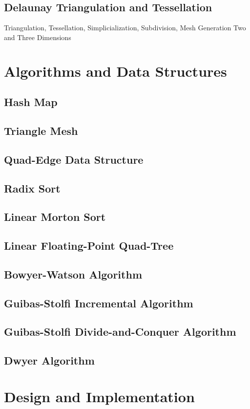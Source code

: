 \documentclass[10pt, twoside, fleqn]{article}
\let\oldsection\section
\renewcommand*\section{%
  \cleardoublepage
  \thispagestyle{sectionstyle}\oldsection}
\begin{document}
    \subsection{Delaunay Triangulation and Tessellation}
      Triangulation, Tessellation, Simplicialization, Subdivision, Mesh Generation
      Two and Three Dimensions
  \section{Algorithms and Data Structures}
    \subsection{Hash Map}
    \subsection{Triangle Mesh}
    \subsection{Quad-Edge Data Structure}
    \subsection{Radix Sort}
    \subsection{Linear Morton Sort}
    \subsection{Linear Floating-Point Quad-Tree}
    \subsection{Bowyer-Watson Algorithm}
    \subsection{Guibas-Stolfi Incremental Algorithm}
    \subsection{Guibas-Stolfi Divide-and-Conquer Algorithm}
    \subsection{Dwyer Algorithm}
  \section{Design and Implementation}
\end{document}
